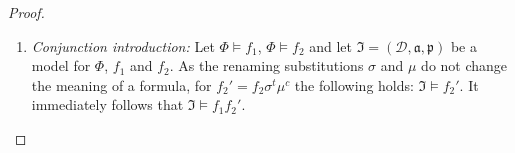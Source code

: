 \begin{proof}
\begin{enumerate}
 \item \emph{Conjunction introduction:} 
 Let $\Phi\models f_1$, $\Phi\models f_2$ and let  $\mathfrak{I}=(\mathcal{D},\mathfrak{a,p})$ be a model for $\Phi$, $f_1$ and $f_2$. 
As the renaming substitutions $\sigma$ and $\mu$ do not change the meaning of a formula, for  $f_2'= f_2\sigma^t\mu^c$ the following holds:
$\mathfrak{I}\models f_2'$. 
It immediately follows that $\mathfrak{I}\models f_1f_2'$. %
% 

\end{enumerate}
\end{proof}
